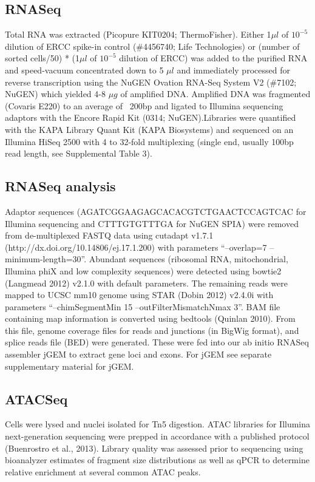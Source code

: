 \subsection{RNASeq}
Total RNA was extracted (Picopure KIT0204; ThermoFisher). Either 1$\mu l$ of $10^{-5}$ dilution of ERCC spike-in control (\#4456740; Life Technologies) or (number of sorted cells/50) * (1$\mu l$ of $10^{-5}$ dilution of ERCC) was added to the purified RNA and speed-vacuum concentrated down to 5 $\mu l$ and immediately processed for reverse transcription using the NuGEN Ovation RNA-Seq System V2 (\#7102; NuGEN) which yielded 4-8 $\mu g$ of amplified DNA. Amplified DNA was fragmented (Covaris E220) to an average of ~200bp and ligated to Illumina sequencing adaptors with the Encore Rapid Kit (0314; NuGEN).Libraries were quantified with the KAPA Library Quant Kit (KAPA Biosystems) and sequenced on an Illumina HiSeq 2500 with 4 to 32-fold multiplexing (single end, usually 100bp read length, see Supplemental Table 3).

\subsection{RNASeq analysis}
Adaptor sequences (AGATCGGAAGAGCACACGTCTGAACTCCAGTCAC for Illumina sequencing and CTTTGTGTTTGA for NuGEN SPIA) were removed from de-multiplexed FASTQ data using cutadapt v1.7.1 (http://dx.doi.org/10.14806/ej.17.1.200) with parameters “--overlap=7 --minimum-length=30”. Abundant sequences (ribosomal RNA, mitochondrial, Illumina phiX and low complexity sequences) were detected using bowtie2 (Langmead 2012) v2.1.0 with default parameters. The remaining reads were mapped to UCSC mm10 genome using STAR (Dobin 2012) v2.4.0i with parameters “--chimSegmentMin 15 --outFilterMismatchNmax 3”. BAM file containing map information is converted using bedtools (Quinlan 2010). From this file, genome coverage files for reads and junctions (in BigWig format), and splice reads file (BED) were generated. These were fed into our ab initio RNASeq assembler jGEM to extract gene loci and exons. For jGEM see separate supplementary material for jGEM.

\subsection{ATACSeq}
Cells were lysed and nuclei isolated for Tn5 digestion. ATAC libraries for Illumina next-generation sequencing were prepped in accordance with a published protocol (Buenrostro et al., 2013). Library quality was assessed prior to sequencing using bioanalyzer estimates of fragment size distributions as well as qPCR to determine relative enrichment at several common ATAC peaks.

